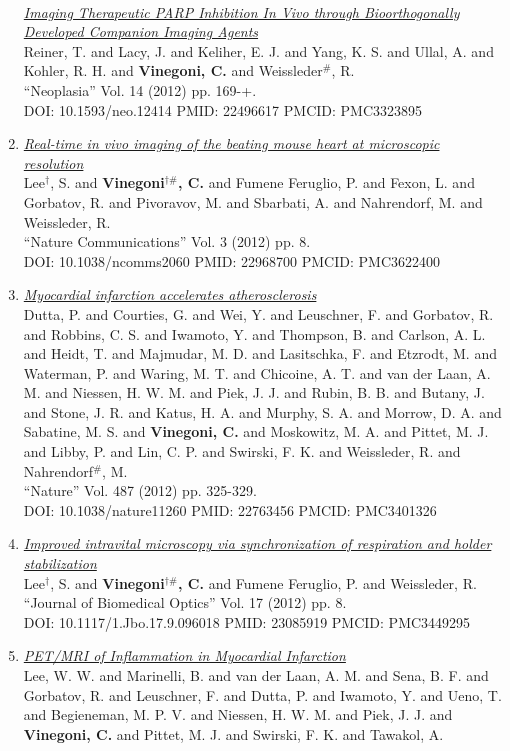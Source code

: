 \documentclass{resume}
\begin{document}
\begin{category}{~~}
\begin{enumerate}
\href{https://cvinegoni.github.io/assets/pdf/papers/2012-NEOPLASIA.pdf}{\it  Imaging Therapeutic PARP Inhibition In Vivo through Bioorthogonally Developed Companion Imaging Agents} \\ Reiner, T. and Lacy, J. and Keliher, E. J. and Yang, K. S. and Ullal, A. and Kohler, R. H. and {\bf Vinegoni, C.} and Weissleder$^\#$, R. \\ ``Neoplasia'' Vol. 14 (2012) pp. 169-+. \\ DOI: 10.1593/neo.12414 PMID: 22496617 PMCID: PMC3323895\item \href{https://cvinegoni.github.io/assets/pdf/papers/2012-NC.pdf}{\it  Real-time in vivo imaging of the beating mouse heart at microscopic resolution} \\ Lee$^\dag$, S. and {\bf Vinegoni$^{\dag \#}$, C.} and Fumene Feruglio, P. and Fexon, L. and Gorbatov, R. and Pivoravov, M. and Sbarbati, A. and Nahrendorf, M. and Weissleder, R. \\ ``Nature Communications'' Vol. 3 (2012) pp. 8. \\ DOI: 10.1038/ncomms2060 PMID: 22968700 PMCID: PMC3622400\item \href{https://cvinegoni.github.io/assets/pdf/papers/2012-NATURE.pdf}{\it  Myocardial infarction accelerates atherosclerosis} \\ Dutta, P. and Courties, G. and Wei, Y. and Leuschner, F. and Gorbatov, R. and Robbins, C. S. and Iwamoto, Y. and Thompson, B. and Carlson, A. L. and Heidt, T. and Majmudar, M. D. and Lasitschka, F. and Etzrodt, M. and Waterman, P. and Waring, M. T. and Chicoine, A. T. and van der Laan, A. M. and Niessen, H. W. M. and Piek, J. J. and Rubin, B. B. and Butany, J. and Stone, J. R. and Katus, H. A. and Murphy, S. A. and Morrow, D. A. and Sabatine, M. S. and {\bf Vinegoni, C.} and Moskowitz, M. A. and Pittet, M. J. and Libby, P. and Lin, C. P. and Swirski, F. K. and Weissleder, R. and Nahrendorf$^\#$, M. \\ ``Nature'' Vol. 487 (2012) pp. 325-329. \\ DOI: 10.1038/nature11260 PMID: 22763456 PMCID: PMC3401326\item \href{https://cvinegoni.github.io/assets/pdf/papers/2012-JBO.pdf}{\it  Improved intravital microscopy via synchronization of respiration and holder stabilization} \\ Lee$^\dag$, S. and {\bf Vinegoni$^{\dag \#}$, C.} and Fumene Feruglio, P. and Weissleder, R. \\ ``Journal of Biomedical Optics'' Vol. 17 (2012) pp. 8. \\ DOI: 10.1117/1.Jbo.17.9.096018 PMID: 23085919 PMCID: PMC3449295\item \href{https://cvinegoni.github.io/assets/pdf/papers/2012-JACC.pdf}{\it  PET/MRI of Inflammation in Myocardial Infarction} \\ Lee, W. W. and Marinelli, B. and van der Laan, A. M. and Sena, B. F. and Gorbatov, R. and Leuschner, F. and Dutta, P. and Iwamoto, Y. and Ueno, T. and Begieneman, M. P. V. and Niessen, H. W. M. and Piek, J. J. and {\bf Vinegoni, C.} and Pittet, M. J. and Swirski, F. K. and Tawakol, A. 
\end{enumerate}
\end{category}
\end{document}
